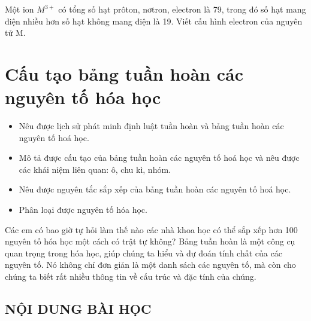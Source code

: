 \begin{bt}
	Một ion $M^{3+}$ có tổng số hạt prôton, nơtron, electron là 79, trong đó số hạt mang điện nhiều hơn số hạt không mang điện là 19. Viết cấu hình electron của nguyên tử M.
\end{bt}
\section{Cấu tạo bảng tuần hoàn các nguyên tố hóa học}
\begin{Muctieu}
	\begin{itemize}
		\item  Nêu được lịch sử phát minh định luật tuần hoàn và bảng tuần hoàn các nguyên tố hoá học.
		\item  Mô tả được cấu tạo của bảng tuần hoàn các nguyên tố hoá học và nêu được các khái niệm liên quan: ô, chu kì, nhóm.
		\item  Nêu được nguyên tắc sắp xếp của bảng tuần hoàn các nguyên tố hoá học.
		\item  Phân loại được nguyên tố hóa học.
	\end{itemize}
\end{Muctieu}
\begin{kd}
	Các em có bao giờ tự hỏi làm thế nào các nhà khoa học có thể sắp xếp hơn 100 nguyên tố hóa học một cách có trật tự không?
	Bảng tuần hoàn là một công cụ quan trọng trong hóa học, giúp chúng ta hiểu và dự đoán tính chất của các nguyên tố. Nó không chỉ đơn giản là một danh sách các nguyên tố, mà còn cho chúng ta biết rất nhiều thông tin về cấu trúc và đặc tính của chúng.
\end{kd}
\subsection{NỘI DUNG BÀI HỌC}
